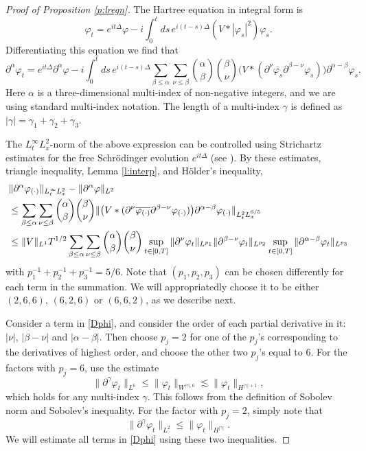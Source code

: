 \documentclass[11pt,a4paper,draft,DIV11]{scrartcl}	%
\begin{document}
\begin{proof}[Proof of Proposition \ref{p:lregn}]
  The Hartree equation in integral form is
  \[
    \varphi_t = e^{it\Delta} \varphi - i \int_0^t ds \, e^{i(t-s)\Delta} (V *
    |\varphi_s|^2) \varphi_s.
  \]
  Differentiating this equation we find that
  \[
    \partial^\alpha \varphi_t = e^{it \Delta} \partial^\alpha \varphi - i
    \int_0^t ds \, e^{i(t-s) \Delta} \sum_{\beta \le \alpha} \sum_{\nu \le
    \beta} \binom{\alpha}{\beta} \binom{\beta}{\nu} \big( V * (\partial^\nu
    \overline{\varphi_s} \partial^{\beta - \nu} \varphi_s) \big)
    \partial^{\alpha - \beta} \varphi_s.
  \]
  Here $\alpha$ is a three-dimensional multi-index of non-negative integers,
  and we are using standard multi-index notation. The length of a multi-index
  $\gamma$ is defined as $|\gamma| = \gamma_1 + \gamma_2 + \gamma_3$.


  The $L_t^\infty L_x^2$-norm of the above expression can be controlled using
  Strichartz estimates for the free Schr\"odinger evolution $e^{it\Delta}$
  (see \cite[Theorem 1.2]{KT}). By these estimates, triangle inequality, Lemma
  \ref{l:interp}, and H\"older's inequality,
  \begin{align}
    & \| \partial^\alpha \varphi_{(\cdot)} \|_{L_t^\infty L_x^2} - \|
    \partial^\alpha \varphi \|_{L^2} \notag \\
    & \le \sum_{\beta \le \alpha} \sum_{\nu \le \beta} \binom{\alpha}{\beta}
    \binom{\beta}{\nu} \| \big( V * (\partial^\nu
    \overline{\varphi_{(\cdot)}} \partial^{\beta - \nu} \varphi_{(\cdot)})
    \big) \partial^{\alpha - \beta} \varphi_{(\cdot)} \|_{L_t^2 L_x^{6/5}}
    \notag \\
    & \le \| V \|_{L^1} T^{1/2} \sum_{\beta \le \alpha} \sum_{\nu \le \beta}
    \binom{\alpha}{\beta} \binom{\beta}{\nu} \sup_{t \in [0,T]} \|
    \partial^\nu \varphi_t \|_{L^{p_1}} \| \partial^{\beta - \nu} \varphi_t
    \|_{L^{p_2}} \sup_{t \in [0,T]} \| \partial^{\alpha - \beta} \varphi_t
    \|_{L^{p_3}} \label{Dphi}
  \end{align}
  with $p_1^{-1} + p_2^{-1} + p_3^{-1} = 5/6$. Note that $(p_1, p_2, p_3)$ can
  be chosen differently for each term in the summation. We will appropriatedly
  choose it to be either $(2,6,6)$, $(6,2,6)$ or $(6,6,2)$, as we describe
  next.


  Consider a term in \eqref{Dphi}, and consider the order of each partial
  derivative in it: $|\nu|$, $|\beta-\nu|$ and $|\alpha-\beta|$. Then choose
  $p_j = 2$ for one of the $p_j$'s corresponding to the derivatives of highest
  order, and choose the other two $p_j$'s equal to $6$. For the factors with
  $p_j = 6$, use the estimate
  \[
    \| \partial^\gamma \varphi_t \|_{L^6} \le \| \varphi_t \|_{W^{|\gamma|,6}}
    \apprle \| \varphi_t \|_{H^{|\gamma|+1}},
  \]
  which holds for any multi-index $\gamma$. This follows from the definition
  of Sobolev norm and Sobolev's inequality. For the factor with $p_j = 2$,
  simply note that
  \[
    \| \partial^\gamma \varphi_t \|_{L^2} \le \| \varphi_t \|_{H^{|\gamma|}}.
  \]
  We will estimate all terms in \eqref{Dphi} using these two inequalities.



\end{proof}
\end{document}
